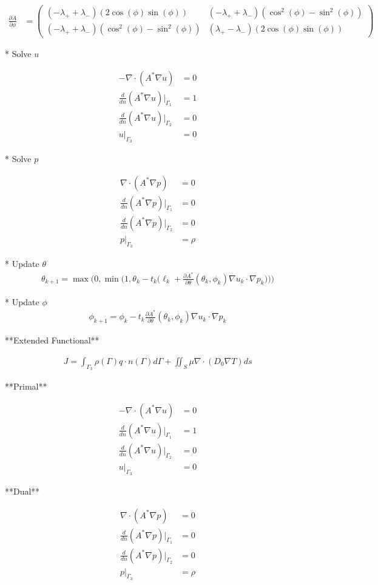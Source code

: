 \documentclass[11pt]{article}
\begin{document}
\begin{appendix}
\begin{align*}
\frac{\partial A}{\partial\phi} &= \begin{pmatrix} (-\lambda_++\lambda_-)(2\cos(\phi)\sin(\phi)) & (-\lambda_++\lambda_-)(\cos^2(\phi)-\sin^2(\phi))
\\ (-\lambda_++\lambda_-)(\cos^2(\phi)-\sin^2(\phi)) & (\lambda_+-\lambda_-)(2\cos(\phi)\sin(\phi)) \end{pmatrix}\end{align*}

* Solve $u$

\begin{align*}
-\nabla \cdot (A^* \nabla u) &= 0\\
\frac{d}{dn}(A^*\nabla u)\vert_{\Gamma_1} &= 1\\
\frac{d}{dn}(A^*\nabla u)\vert_{\Gamma_2} &= 0\\
u\vert_{\Gamma_3}&=0
\end{align*}

* Solve $p$

\begin{align*}
\nabla \cdot (A^* \nabla p) &= 0\\
\frac{d}{dn}(A^*\nabla p)\vert_{\Gamma_1} &= 0\\
\frac{d}{dn}(A^*\nabla p)\vert_{\Gamma_2} &= 0\\
p\vert_{\Gamma_3}&=\rho
\end{align*}


* Update $\theta$
\begin{align*}
\theta_{k+1} = \max \bigg( 0,\min \bigg(1,\theta_k-t_k\bigg(\ell_k+\frac{\partial A^*}{\partial \theta}(\theta_k,\phi_k)\nabla u_k\cdot \nabla p_k\bigg) \bigg)\bigg)\end{align*}

* Update $\phi$
\begin{align*}
\phi_{k+1} = \phi_k-t_k\frac{\partial A^*}{\partial \theta}(\theta_k,\phi_k)\nabla u_k\cdot \nabla p_k\end{align*}

**Extended Functional**

\begin{align*}
J = \int_{\Gamma_3}\rho(\Gamma)q\cdot n(\Gamma)d\Gamma + \iint_S \mu \nabla\cdot (D_0\nabla T)ds
\end{align*}

**Primal**

\begin{align*}
-\nabla \cdot (A^* \nabla u) &= 0\\
\frac{d}{dn}(A^*\nabla u)\vert_{\Gamma_1} &= 1\\
\frac{d}{dn}(A^*\nabla u)\vert_{\Gamma_2} &= 0\\
u\vert_{\Gamma_3}&=0
\end{align*}

**Dual**

\begin{align*}
\nabla \cdot (A^* \nabla p) &= 0\\
\frac{d}{dn}(A^*\nabla p)\vert_{\Gamma_1} &= 0\\
\frac{d}{dn}(A^*\nabla p)\vert_{\Gamma_2} &= 0\\
p\vert_{\Gamma_3}&=\rho
\end{align*}

\end{appendix}
\end{document}
